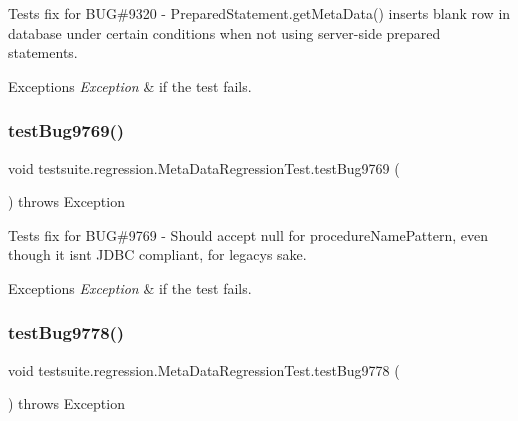 Tests fix for B\+UG\#9320 -\/ Prepared\+Statement.\+get\+Meta\+Data() inserts blank row in database under certain conditions when not using server-\/side prepared statements.


\begin{DoxyExceptions}{Exceptions}
{\em Exception} & if the test fails. \\
\hline
\end{DoxyExceptions}
\mbox{\label{classtestsuite_1_1regression_1_1_meta_data_regression_test_aaeda7a5f9b968ba3bb866fb2fb62b75c}} 
\subsubsection{\texorpdfstring{test\+Bug9769()}{testBug9769()}}
{\footnotesize\ttfamily void testsuite.\+regression.\+Meta\+Data\+Regression\+Test.\+test\+Bug9769 (\begin{DoxyParamCaption}{ }\end{DoxyParamCaption}) throws Exception}

Tests fix for B\+UG\#9769 -\/ Should accept null for procedure\+Name\+Pattern, even though it isn\textquotesingle{}t J\+D\+BC compliant, for legacy\textquotesingle{}s sake.


\begin{DoxyExceptions}{Exceptions}
{\em Exception} & if the test fails. \\
\hline
\end{DoxyExceptions}
\mbox{\label{classtestsuite_1_1regression_1_1_meta_data_regression_test_a0cb82d7f4b575ebc9da191ff69ab222c}} 
\subsubsection{\texorpdfstring{test\+Bug9778()}{testBug9778()}}
{\footnotesize\ttfamily void testsuite.\+regression.\+Meta\+Data\+Regression\+Test.\+test\+Bug9778 (\begin{DoxyParamCaption}{ }\end{DoxyParamCaption}) throws Exception}

